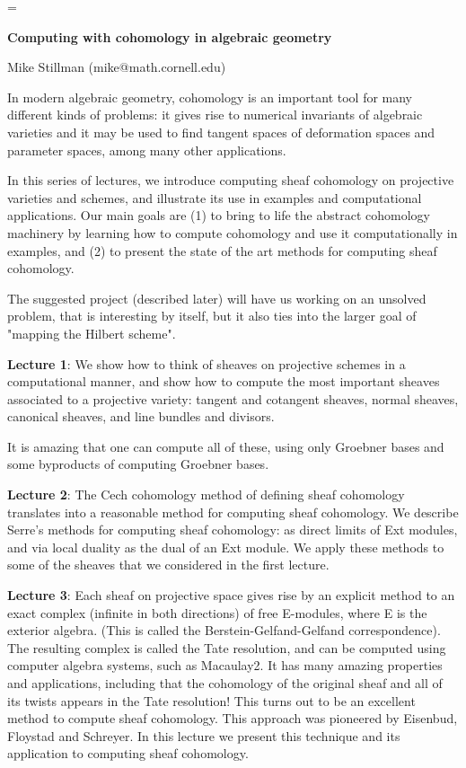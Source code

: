 \magnification=
\centerline{\bf Computing with cohomology in algebraic geometry}
\bigskip
\centerline{Mike Stillman (mike@math.cornell.edu)}

\bigskip
In modern algebraic geometry, cohomology is an important tool for many
different kinds of problems: it gives rise to numerical invariants of
algebraic varieties and it may be used to find tangent spaces of
deformation spaces and parameter spaces, among many other
applications.

\smallskip%
In this series of lectures, we introduce computing sheaf cohomology on
projective varieties and schemes, and illustrate its use in examples
and computational applications.  Our main goals are (1) to bring to
life the abstract cohomology machinery by learning how to compute
cohomology and use it computationally in examples, and (2) to present
the state of the art methods for computing sheaf cohomology.
 
\smallskip%
The suggested project (described later) will have us working on an
unsolved problem, that is interesting by itself, but it also ties into
the larger goal of "mapping the Hilbert scheme".

\bigskip\noindent
{\bf Lecture 1}: We show how to think of sheaves on projective schemes in a
computational manner, and show how to compute the most important
sheaves associated to a projective variety: tangent and cotangent
sheaves, normal sheaves, canonical sheaves, and line bundles and
divisors.

It is amazing that one can compute all of these, using only Groebner
bases and some byproducts of computing Groebner bases.

\bigskip\noindent
{\bf Lecture 2}: The Cech cohomology method of defining sheaf cohomology
translates into a reasonable method for computing sheaf cohomology.
We describe Serre's methods for computing sheaf cohomology: as direct
limits of Ext modules, and via local duality as the dual of an Ext
module.  We apply these methods to some of the sheaves that we
considered in the first lecture.

\bigskip\noindent
{\bf Lecture 3}: Each sheaf on projective space gives rise by an explicit
method to an exact complex (infinite in both directions) of free
E-modules, where E is the exterior algebra.  (This is called the 
Berstein-Gelfand-Gelfand correspondence).  The resulting complex is called
the Tate resolution, and can be computed using computer algebra
systems, such as Macaulay2.  It has many amazing properties and
applications, including that the cohomology of the original sheaf
and all of its twists appears in the Tate resolution!  This turns out
to be an excellent method to compute sheaf cohomology.  This approach
was pioneered by Eisenbud, Floystad and Schreyer.  In this lecture we
present this technique and its application to computing sheaf
cohomology.

